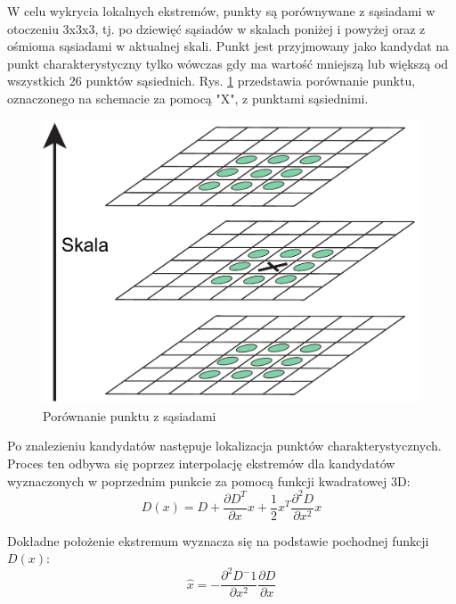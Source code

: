 W celu wykrycia lokalnych ekstremów, punkty są porównywane z sąsiadami w otoczeniu 3x3x3, tj. po dziewięć sąsiadów w skalach poniżej i powyżej oraz z ośmioma sąsiadami w aktualnej skali. Punkt jest przyjmowany jako kandydat na punkt charakterystyczny tylko wówczas gdy ma wartość mniejszą lub większą od wszystkich 26 punktów sąsiednich.\cite{LOWE04} Rys. \ref{fig:sift-gaussian-min-max} przedstawia porównanie punktu, oznaczonego na schemacie za pomocą "X", z punktami sąsiednimi.

\begin{figure}[h]
	\centering
	\includegraphics[scale=0.4]{graphics/01_podstawy_teoretyczne/sift-gaussian-min-max.pdf}
	\caption{Porównanie punktu z sąsiadami \cite{LOWE04}}
	\label{fig:sift-gaussian-min-max}
\end{figure}

Po znalezieniu kandydatów następuje lokalizacja punktów charakterystycznych. Proces ten odbywa się poprzez interpolację ekstremów dla kandydatów wyznaczonych w poprzednim punkcie za pomocą funkcji kwadratowej 3D:
\begin{equation} 
\label{sift_3d} 
D(x) = D + \frac{\partial D^T}{\partial x} x + \frac{1}{2}x^T \frac{\partial^2 D}{\partial x^2} x
\end{equation}

Dokładne położenie ekstremum wyznacza się na podstawie pochodnej funkcji $D(x)$:
\begin{equation} 
\label{sift_pochodna_D} 
\hat{x} = -\frac{\partial^2 D^-1}{\partial x^2}\frac{\partial D}{\partial x}
\end{equation}

